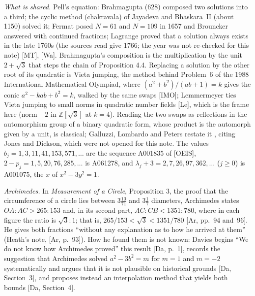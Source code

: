\documentclass[11pt]{article}
\begin{document}
\noindent\emph{What is shared.} Pell's equation: Brahmagupta (628) composed two solutions into a third; the cyclic method (chakravala) of Jayadeva and Bh\=askara~II (about 1150) solved it; Fermat posed $N=61$ and $N=109$ in 1657 and Brouncker answered with continued fractions; Lagrange proved that a solution always exists in the late 1760s (the sources read give 1766; the year was not re-checked for this note) [MT], [Wa]. Brahmagupta's composition is the multiplication by the unit $2+\sqrt3$ that steps the chain of Proposition 4.4. Replacing a solution by the other root of its quadratic is Vieta jumping, the method behind Problem~6 of the 1988 International Mathematical Olympiad, where $(a^2+b^2)/(ab+1)=k$ gives the conic $a^2-kab+b^2=k$, walked by the same swaps [IMO]; Lemmermeyer ties Vieta jumping to small norms in quadratic number fields [Le], which is the frame here (norm $-2$ in $\mathbb{Z}[\sqrt3]$ at $k=4$). Reading the two swaps as reflections in the automorphism group of a binary quadratic form, whose product is the automorph given by a unit, is classical; Galluzzi, Lombardo and Peters restate it \cite[Propositions~2.5 and~2.7, pages~6 and~7, and page~14]{GLP}, citing Jones and Dickson, which were not opened for this note. The values $b_j=1,3,11,41,153,571,\dots$ are the sequence A001835 of [OEIS], $2-p_j=1,5,20,76,285,\dots$ is A061278, and $\lambda_j+3=2,7,26,97,362,\dots$ ($j\ge0$) is A001075, the $x$ of $x^2-3y^2=1$.

\medskip
\noindent\emph{Archimedes.} In \emph{Measurement of a Circle}, Proposition 3, the proof that the circumference of a circle lies between $3\frac{10}{71}$ and $3\frac17$ diameters, Archimedes states $OA:AC>265:153$ and, in its second part, $AC:CB<1351:780$, where in each figure the ratio is $\sqrt3:1$; that is, $265/153<\sqrt3<1351/780$ [Ar, pp.~94 and~96]. He gives both fractions ``without any explanation as to how he arrived at them'' (Heath's note, [Ar, p.~93]). How he found them is not known: Davies begins ``We do not know how Archimedes proved'' this result [Da, p.~1], records the suggestion that Archimedes solved $a^2-3b^2=m$ for $m=1$ and $m=-2$ systematically and argues that it is not plausible on historical grounds [Da, Section~3], and proposes instead an interpolation method that yields both bounds [Da, Section~4].
\end{document}
